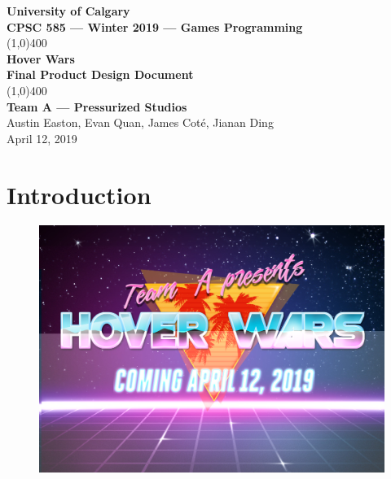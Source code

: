 \documentclass{article}
\newcommand{\namenobold}{Hover Wars}
\newcommand{\team}{Team A --- Pressurized Studios}
\theoremstyle{definition}
\begin{document}
\begin{titlepage}
  \begin{center}
    \vspace*{1cm}
    \Large{\textbf{University of Calgary}}\\
    \Large{\textbf{CPSC 585 --- Winter 2019 --- Games Programming}}\\
    \vfill
    \line(1,0){400}\\[1mm]
    \huge{\textbf{\namenobold{}}}\\
    \large{\textbf{Final Product Design Document}}\\
    \line(1,0){400}\\
    \vfill
    \Large{\textbf{\team{}}}\\
    \Large{Austin Easton, Evan Quan, James Cot\'{e}, Jianan Ding}\\
    \large{April 12, 2019}
  \end{center}
\end{titlepage}
\setcounter{page}{0}
\tableofcontents
{}
\break{}

\section{Introduction}

\begin{figure}[htpb]
  \centering
  \includegraphics[width=1.0\linewidth]{images/title_art_hover_wars.jpg}
\label{fig:title_art}
\end{figure}
\end{document}
